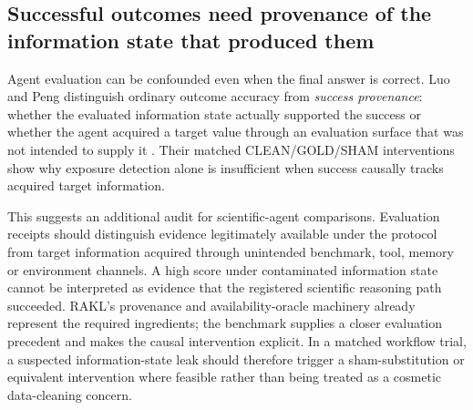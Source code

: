 \subsection{Successful outcomes need provenance of the information state that produced them}

Agent evaluation can be confounded even when the final answer is correct. Luo and Peng distinguish ordinary outcome accuracy from \emph{success provenance}: whether the evaluated information state actually supported the success or whether the agent acquired a target value through an evaluation surface that was not intended to supply it \cite{luo2026success}. Their matched CLEAN/GOLD/SHAM interventions show why exposure detection alone is insufficient when success causally tracks acquired target information.

This suggests an additional audit for scientific-agent comparisons. Evaluation receipts should distinguish evidence legitimately available under the protocol from target information acquired through unintended benchmark, tool, memory or environment channels. A high score under contaminated information state cannot be interpreted as evidence that the registered scientific reasoning path succeeded. RAKL's provenance and availability-oracle machinery already represent the required ingredients; the benchmark supplies a closer evaluation precedent and makes the causal intervention explicit. In a matched workflow trial, a suspected information-state leak should therefore trigger a sham-substitution or equivalent intervention where feasible rather than being treated as a cosmetic data-cleaning concern.
